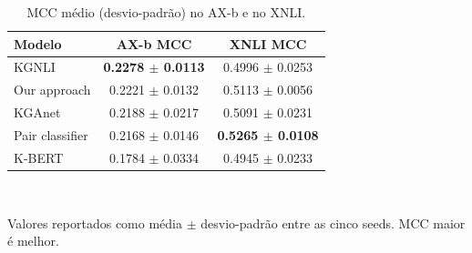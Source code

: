 \begin{table}[ht]
\centering
\caption{MCC médio (desvio-padrão) no AX-b e no XNLI.}
\label{tab:experiment022-overall-mcc}
\begin{tabular}{lcc}
\toprule
Modelo & AX-b MCC & XNLI MCC \\
\midrule
KGNLI & \textbf{0.2278 $\pm$ 0.0113} & 0.4996 $\pm$ 0.0253 \\
Our approach & 0.2221 $\pm$ 0.0132 & 0.5113 $\pm$ 0.0056 \\
KGAnet & 0.2188 $\pm$ 0.0217 & 0.5091 $\pm$ 0.0231 \\
Pair classifier & 0.2168 $\pm$ 0.0146 & \textbf{0.5265 $\pm$ 0.0108} \\
K-BERT & 0.1784 $\pm$ 0.0334 & 0.4945 $\pm$ 0.0233 \\
\bottomrule
\end{tabular}
\\
\parbox{0.85\linewidth}{\footnotesize Valores reportados como média $\pm$ desvio-padrão entre as cinco seeds. MCC maior é melhor.}
\end{table}
